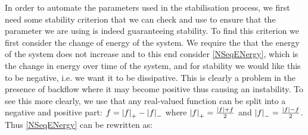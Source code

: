 In order to automate the parameters used in the stabilisation process, we first need some stability criterion that we can check and use to ensure that the parameter we are using is indeed guaranteeing stability. To find this criterion we first consider the change of energy of the system. We require the that the energy of the system does not increase and to this end consider \autoref{NSeqENergy}, which is the change in energy over time of the system, and for stability we would like this to be negative, i.e. we want it to be dissipative. This is clearly a problem in the presence of backflow where it may become positive thus causing an instability. To see this more clearly, we use that any real-valued function can be split into a negative and positive part: \( f = \abs{f}_+ - \abs{f}_-\) where \( \abs{f}_+ = \frac{\abs{f} + f}{2}\) and \( \abs{f}_- = \frac{\abs{f} - f}{2}\). Thus \autoref{NSeqENergy} can be rewritten as:

